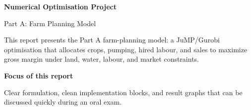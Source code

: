 \documentclass[11pt,a4paper]{article}
\begin{document}
\hypersetup{pageanchor=false}
\begin{titlepage}
\thispagestyle{empty}

\vspace*{2.1cm}
{\color{white}\huge\bfseries Numerical Optimisation Project\par}
\vspace{0.55cm}
{\color{white}\LARGE Part A: Farm Planning Model\par}
\vspace{1.3cm}

\begin{minipage}{0.92\textwidth}
\color{white}
This report presents the Part A farm-planning model: a JuMP/Gurobi optimisation that allocates crops, pumping, hired labour, and sales to maximize gross margin under land, water, labour, and market constraints.
\end{minipage}

\vfill
\begin{minipage}{0.92\textwidth}
\color{white}
\textbf{Focus of this report}\par
\smallskip
Clear formulation, clean implementation blocks, and result graphs that can be discussed quickly during an oral exam.
\end{minipage}

\vspace*{1.7cm}
\end{titlepage}

\clearpage
\hypersetup{pageanchor=true}
\setcounter{page}{1}

\tableofcontents
\newpage


\end{document}

